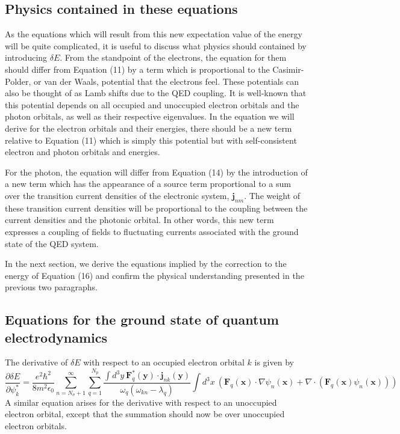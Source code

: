 \documentclass[aps,prb,onecolumn,
	groupedaddress,superscriptaddress,
	amsfonts,amssymb,amsmath,floatfix,
	citeautoscript]{revtex4-1}
\begin{document}
\subsection{Physics contained in these equations}

As the equations which will result from this new expectation value of the energy will be quite complicated, it is useful to discuss what physics should contained by introducing $\delta E$. From the standpoint of the electrons, the equation for them should differ from Equation (11) by a term which is proportional to the Casimir-Polder, or van der Waals, potential that the electrons feel.  These potentials can also be thought of as Lamb shifts due to the QED coupling. It is well-known that this potential depends on all occupied and unoccupied electron orbitals and the photon orbitals, as well as their respective eigenvalues. In the equation we will derive for the electron orbitals and their energies, there should be a new term relative to Equation (11) which is simply this potential but with self-consistent electron and photon orbitals and energies.

For the photon, the equation will differ from Equation (14) by the introduction of a new term which has the appearance of a source term proportional to a sum over the transition current densities of the electronic system, $\mathbf{j}_{nm}$. The weight of these transition current densities will be proportional to the coupling between the current densities and the photonic orbital. In other words, this new term expresses a coupling of fields to fluctuating currents associated with the ground state of the QED system. 

In the next section, we derive the equations implied by the correction to the energy of Equation (16) and confirm the physical understanding presented in the previous two paragraphs.

\subsection{Equations for the ground state of quantum electrodynamics}

The derivative of $\delta E$ with respect to an occupied electron orbital $k$ is given by
\begin{equation}
\frac{\partial\delta E}{\partial \psi_k^*} = \frac{e^2\hbar^2}{8m^2\epsilon_0}\sum\limits_{n=N_{\sigma}+1}^{\infty}\sum\limits_{q=1}^{N_p} \frac{\int d^3y~\mathbf{F}^*_q(\mathbf{y})\cdot\mathbf{j}_{nk}(\mathbf{y})}{\omega_q(\omega_{kn}-\lambda_q)}\int d^3x~\left( \mathbf{F}_q(\mathbf{x})\cdot\nabla\psi_n(\mathbf{x}) + \nabla\cdot(\mathbf{F}_q(\mathbf{x})\psi_n(\mathbf{x}))\right)
\end{equation}
A similar equation arises for the derivative with respect to an unoccupied electron orbital, except that the summation should now be over unoccupied electron orbitals.
\end{document}

